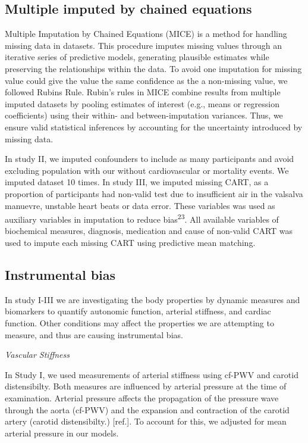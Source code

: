 \documentclass[
  a4paper,
  headsepline=true,
  open=any]{scrbook}
\begin{document}
\hypertarget{multiple-imputed-by-chained-equations}{%
\subsection{Multiple imputed by chained
equations}\label{multiple-imputed-by-chained-equations}}

Multiple Imputation by Chained Equations (MICE) is a method for handling
missing data in datasets. This procedure imputes missing values through
an iterative series of predictive models, generating plausible estimates
while preserving the relationships within the data. To avoid one
imputation for missing value could give the value the same confidence as
the a non-missing value, we followed Rubins Rule. Rubin's rules in MICE
combine results from multiple imputed datasets by pooling estimates of
interest (e.g., means or regression coefficients) using their within-
and between-imputation variances. Thus, we ensure valid statistical
inferences by accounting for the uncertainty introduced by missing data.

In study II, we imputed confounders to include as many participants and
avoid excluding population with our without cardiovascular or mortality
events. We imputed dataset 10 times. In study III, we imputed missing
CART, as a proportion of participants had non-valid test due to
insufficient air in the valsalva manuevre, unstable heart beats or data
error. These variables was used as auxiliary variables in imputation to
reduce bias\textsuperscript{23}. All available variables of biochemical
measures, diagnosis, medication and cause of non-valid CART was used to
impute each missing CART using predictive mean matching.

\hypertarget{instrumental-bias}{%
\subsection{Instrumental bias}\label{instrumental-bias}}

In study I-III we are investigating the body properties by dynamic
measures and biomarkers to quantify autonomic function, arterial
stiffness, and cardiac function. Other conditions may affect the
properties we are attempting to measure, and thus are causing
instrumental bias.

\emph{Vascular Stiffness}

In Study I, we used measurements of arterial stiffness using cf-PWV and
carotid distensibilty. Both measures are influenced by arterial pressure
at the time of examination. Arterial pressure affects the propagation of
the pressure wave through the aorta (cf-PWV) and the expansion and
contraction of the carotid artery (carotid distensibilty.) {[}ref.{]}.
To account for this, we adjusted for mean arterial pressure in our
models.
\end{document}
